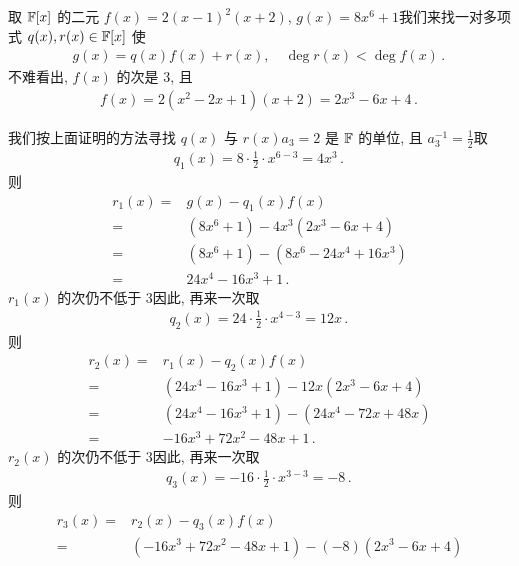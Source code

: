 \begin{example}
    取 $\mathbb{F}[x]$ 的二元 $f(x) = 2(x-1)^2 (x+2)$, $g(x) = 8x^6 + 1$\period 我们来找一对多项式 $q(x), r(x) \in \mathbb{F}[x]$ 使
    \begin{align*}
        g(x) = q(x) f(x) + r(x), \quad \deg r(x) < \deg f(x) \period
    \end{align*}
    不难看出, $f(x)$ 的次是 3, 且
    \begin{align*}
        f(x) = 2(x^2 - 2x + 1)(x+2) = 2x^3 - 6x + 4\period
    \end{align*}

    我们按上面证明的方法寻找 $q(x)$ 与 $r(x)$\period $a_3 = 2$ 是 $\mathbb{F}$ 的单位, 且 $a_3^{-1} = \frac12$\period 取
    \begin{align*}
        q_1 (x) = 8\cdot \frac12 \cdot x^{6-3} = 4x^3 \period
    \end{align*}
    则
    \begin{align*}
        r_1 (x)
        = {} & g(x) - q_1(x) f(x)                  \\
        = {} & (8x^6 + 1) - 4x^3 (2x^3 - 6x + 4)   \\
        = {} & (8x^6 + 1) - (8x^6 - 24x^4 + 16x^3) \\
        = {} & 24x^4 - 16x^3 + 1 \period
    \end{align*}
    $r_1 (x)$ 的次仍不低于 $3$\period 因此, 再来一次\period 取
    \begin{align*}
        q_2 (x) = 24 \cdot \frac12 \cdot x^{4-3} = 12x \period
    \end{align*}
    则
    \begin{align*}
        r_2 (x)
        = {} & r_1 (x) - q_2(x) f(x)                     \\
        = {} & (24x^4 - 16x^3 + 1) - 12x (2x^3 - 6x + 4) \\
        = {} & (24x^4 - 16x^3 + 1) - (24x^4 - 72x + 48x) \\
        = {} & -16x^3 + 72x^2 - 48x + 1 \period
    \end{align*}
    $r_2 (x)$ 的次仍不低于 $3$\period 因此, 再来一次\period 取
    \begin{align*}
        q_3 (x) = -16 \cdot \frac12 \cdot x^{3-3} = -8 \period
    \end{align*}
    则
    \begin{align*}
        r_3 (x)
        = {} & r_2 (x) - q_3(x) f(x)                             \\
        = {} & (-16x^3 + 72x^2 - 48x + 1) - (-8) (2x^3 - 6x + 4) \\

\end{align*}
\end{example}
